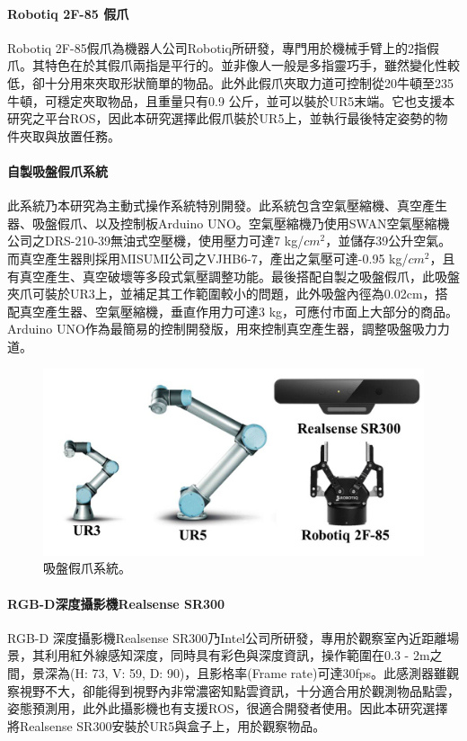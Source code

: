 \paragraph{Robotiq 2F-85 假爪}
Robotiq 2F-85假爪為機器人公司Robotiq所研發，專門用於機械手臂上的2指假爪。其特色在於其假爪兩指是平行的。並非像人一般是多指靈巧手，雖然變化性較低，卻十分用來夾取形狀簡單的物品。此外此假爪夾取力道可控制從20牛頓至235牛頓，可穩定夾取物品，且重量只有0.9 公斤，並可以裝於UR5末端。它也支援本研究之平台ROS，因此本研究選擇此假爪裝於UR5上，並執行最後特定姿勢的物件夾取與放置任務。

\paragraph{自製吸盤假爪系統}
此系統乃本研究為主動式操作系統特別開發。此系統包含空氣壓縮機、真空產生器、吸盤假爪、以及控制板Arduino UNO。空氣壓縮機乃使用SWAN空氣壓縮機公司之DRS-210-39無油式空壓機，使用壓力可達7 kg/$cm^{2}$，並儲存39公升空氣。而真空產生器則採用MISUMI公司之VJHB6-7，產出之氣壓可達-0.95 kg/$cm^{2}$，且有真空產生、真空破壞等多段式氣壓調整功能。最後搭配自製之吸盤假爪，此吸盤夾爪可裝於UR3上，並補足其工作範圍較小的問題，此外吸盤內徑為0.02cm，搭配真空產生器、空氣壓縮機，垂直作用力可達3 kg，可應付市面上大部分的商品。Arduino UNO作為最簡易的控制開發版，用來控制真空產生器，調整吸盤吸力力道。

\begin{figure}[ht]
	\centering
	\includegraphics[height=!, width=1.0\linewidth, keepaspectratio=true]
	{./figures/hardware_list.jpg}
  \caption{吸盤假爪系統。}
  \label{figure:suction_gripper}
\end{figure}

\paragraph{RGB-D深度攝影機Realsense SR300}
RGB-D 深度攝影機Realsense SR300乃Intel公司所研發，專用於觀察室內近距離場景，其利用紅外線感知深度，同時具有彩色與深度資訊，操作範圍在0.3 - 2m之間，景深為(H: 73, V: 59, D: 90)，且影格率(Frame rate)可達30fps。此感測器雖觀察視野不大，卻能得到視野內非常濃密知點雲資訊，十分適合用於觀測物品點雲，姿態預測用，此外此攝影機也有支援ROS，很適合開發者使用。因此本研究選擇將Realsense SR300安裝於UR5與盒子上，用於觀察物品。

